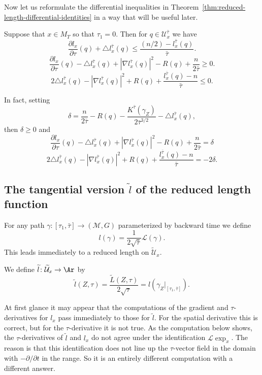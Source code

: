 Now let us reformulate the differential inequalities in
Theorem~\ref{thm:reduced-length-differential-identities} in a way that will be useful later.

\begin{corollary}\label{cor:reduced-length-pde-inequalities}
\label{lformula}
Suppose that $x\in M_T$ so that $\tau_1=0$. Then for $q\in{\mathcal
U}^{\bar\tau}_x$ we have
$$\frac{\partial l_x}{\partial \tau}(q)+\triangle l_x^{\bar\tau}(q)\le \frac{(n/2)-l_x^{\bar\tau}(q)}{\bar\tau}.$$
$$\frac{\partial l_x}{\partial \tau}(q)-\triangle l_x^{\bar\tau}(q)+|\nabla l_x^{\bar\tau}(q)|^2-R(q)+\frac{n}{2\bar\tau}\ge 0 .$$
$$2\triangle l_x^{\bar\tau}(q)-|\nabla l_x^{\bar\tau}(q)|^2+R(q)+\frac{l_x^{\bar\tau}(q)-n}{\bar\tau}
\le 0.$$

In fact, setting $$\delta=\frac{n}{2
\bar\tau}-R(q)-\frac{K^{\bar\tau}(\gamma_Z)}{2\bar\tau^{3/2}}-\triangle
l_x^{\bar\tau}(q),$$ then $\delta\ge 0$ and
$$\frac{\partial l_x}{\partial \tau}(q)-\triangle l_x^{\bar\tau}(q)
+|\nabla l_x^{\bar\tau}(q)|^2-R(q)+\frac{n}{2\bar\tau}=\delta$$
$$2\triangle l_x^{\bar\tau}(q)-|\nabla l_x^{\bar\tau}(q)|^2+R(q)
+\frac{l_x^{\bar\tau}(q)-n}{\bar\tau}=-2\delta.$$
\end{corollary}

\subsection{The tangential version $\widetilde l$ of the reduced length function}

For any path $\gamma\colon [\tau_1,\bar\tau]\to ({\mathcal M},G)$
parameterized by backward time we define
$$l(\gamma)=\frac{1}{2\sqrt{\bar\tau}}{\mathcal L}(\gamma).$$
This leads immediately to a reduced length on $\widetilde {\mathcal
U}_x$.


\begin{definition}\label{def:reduced-length-tangential}
We define $\widetilde l\colon \widetilde {\mathcal U}_x\to
\Ar$  by
$$\widetilde l(Z,\tau)=\frac{\widetilde L(Z,\tau)}{2\sqrt{\tau}}=l(\gamma_Z|_{[\tau_1,\bar\tau]}).$$
\end{definition}

At first glance it may appear that the computations of the gradient
and $\tau$-derivatives for $l_x$ pass immediately to those for
$\widetilde l$. For the spatial derivative this is correct, but for
the $\tau$-derivative it is not true. As the computation below
shows, the $\tau$-derivatives of $\widetilde l$ and $l_x$ do not
agree under the identification ${\mathcal L}\exp_x$. The reason
is that this identification does not line up the $\tau$-vector field
in the domain with $-\partial/\partial t$ in the range. So it is an
entirely different computation with a different answer.




